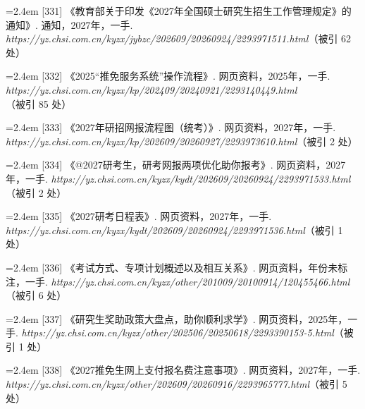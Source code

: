 {\vspace{0.6pt}
\noindent\hangindent=2.4em \label{src:S0442}{\color{cAccent}[331]} 《教育部关于印发《2027年全国硕士研究生招生工作管理规定》的通知》. 通知，2027年，一手. \textit{https://yz.chsi.com.cn/kyzx/jybzc/202609/20260924/2293971511.html}（被引 62 处）\par
\vspace{0.6pt}
\noindent\hangindent=2.4em \label{src:S0444}{\color{cAccent}[332]} 《2025“推免服务系统”操作流程》. 网页资料，2025年，一手. \textit{https://yz.chsi.com.cn/kyzx/kp/202409/20240921/2293140449.html}（被引 85 处）\par
\vspace{0.6pt}
\noindent\hangindent=2.4em \label{src:S0445}{\color{cAccent}[333]} 《2027年研招网报流程图（统考）》. 网页资料，2027年，一手. \textit{https://yz.chsi.com.cn/kyzx/kp/202609/20260927/2293973610.html}（被引 2 处）\par
\vspace{0.6pt}
\noindent\hangindent=2.4em \label{src:S0447}{\color{cAccent}[334]} 《@2027研考生，研考网报两项优化助你报考》. 网页资料，2027年，一手. \textit{https://yz.chsi.com.cn/kyzx/kydt/202609/20260924/2293971533.html}（被引 2 处）\par
\vspace{0.6pt}
\noindent\hangindent=2.4em \label{src:S0448}{\color{cAccent}[335]} 《2027研考日程表》. 网页资料，2027年，一手. \textit{https://yz.chsi.com.cn/kyzx/kydt/202609/20260924/2293971536.html}（被引 1 处）\par
\vspace{0.6pt}
\noindent\hangindent=2.4em \label{src:S0449}{\color{cAccent}[336]} 《考试方式、专项计划概述以及相互关系》. 网页资料，年份未标注，一手. \textit{https://yz.chsi.com.cn/kyzx/other/201009/20100914/120455466.html}（被引 6 处）\par
\vspace{0.6pt}
\noindent\hangindent=2.4em \label{src:S0450}{\color{cAccent}[337]} 《研究生奖助政策大盘点，助你顺利求学》. 网页资料，2025年，一手. \textit{https://yz.chsi.com.cn/kyzx/other/202506/20250618/2293390153-5.html}（被引 1 处）\par
\vspace{0.6pt}
\noindent\hangindent=2.4em \label{src:S0451}{\color{cAccent}[338]} 《2027推免生网上支付报名费注意事项》. 网页资料，2027年，一手. \textit{https://yz.chsi.com.cn/kyzx/other/202609/20260916/2293965777.html}（被引 5 处）\par
}
